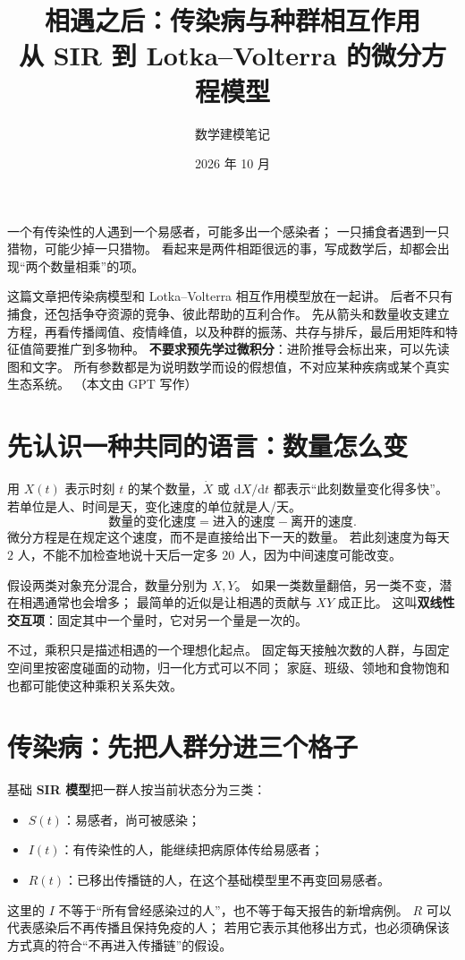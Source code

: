 \documentclass[UTF8,11pt,fontset=none]{ctexart}
\title{\bfseries 相遇之后：传染病与种群相互作用\\[0.35em]
\large 从 SIR 到 Lotka--Volterra 的微分方程模型}
\author{数学建模笔记}
\date{2026 年 10 月}
\begin{document}
\maketitle\pagestyle{plain}\thispagestyle{empty}
\begin{keybox}[这篇文章想做的事]
一个有传染性的人遇到一个易感者，可能多出一个感染者；
一只捕食者遇到一只猎物，可能少掉一只猎物。
看起来是两件相距很远的事，写成数学后，却都会出现“两个数量相乘”的项。

这篇文章把传染病模型和 Lotka--Volterra 相互作用模型放在一起讲。
后者不只有捕食，还包括争夺资源的竞争、彼此帮助的互利合作。
先从箭头和数量收支建立方程，再看传播阈值、疫情峰值，以及种群的振荡、共存与排斥，最后用矩阵和特征值简要推广到多物种。
\textbf{不要求预先学过微积分}：进阶推导会标出来，可以先读图和文字。
所有参数都是为说明数学而设的假想值，不对应某种疾病或某个真实生态系统。
（本文由 GPT 写作）
\end{keybox}

\section{先认识一种共同的语言：数量怎么变}
用 $X(t)$ 表示时刻 $t$ 的某个数量，$\dot X$ 或 $\mathrm dX/\mathrm dt$
都表示“此刻数量变化得多快”。若单位是人、时间是天，变化速度的单位就是人/天。
\[
\text{数量的变化速度}=\text{进入的速度}-\text{离开的速度}.
\]
微分方程是在规定这个速度，而不是直接给出下一天的数量。
若此刻速度为每天 $2$ 人，不能不加检查地说十天后一定多 $20$ 人，因为中间速度可能改变。

假设两类对象充分混合，数量分别为 $X,Y$。
如果一类数量翻倍，另一类不变，潜在相遇通常也会增多；
最简单的近似是让相遇的贡献与 $XY$ 成正比。
这叫\textbf{双线性交互项}：固定其中一个量时，它对另一个量是一次的。

不过，乘积只是描述相遇的一个理想化起点。
固定每天接触次数的人群，与固定空间里按密度碰面的动物，归一化方式可以不同；
家庭、班级、领地和食物饱和也都可能使这种乘积关系失效。

\section{传染病：先把人群分进三个格子}
基础 \textbf{SIR 模型}把一群人按当前状态分为三类：
\begin{itemize}
\item $S(t)$：易感者，尚可被感染；
\item $I(t)$：有传染性的人，能继续把病原体传给易感者；
\item $R(t)$：已移出传播链的人，在这个基础模型里不再变回易感者。
\end{itemize}
这里的 $I$ 不等于“所有曾经感染过的人”，也不等于每天报告的新增病例。
$R$ 可以代表感染后不再传播且保持免疫的人；
若用它表示其他移出方式，也必须确保该方式真的符合“不再进入传播链”的假设。
\end{document}
